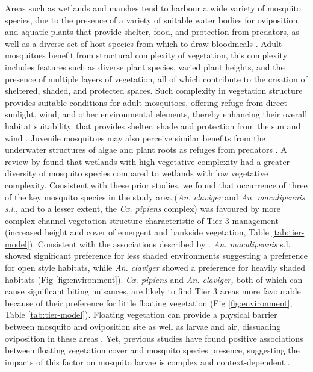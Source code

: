 \documentclass[lineno,sn-basic]{sn-jnl}%
\begin{document}
Areas such as wetlands and marshes tend to harbour a wide variety of mosquito species, due to the presence of a variety of suitable water bodies for oviposition, and aquatic plants that provide shelter, food, and protection from predators, as well as a diverse set of host species from which to draw bloodmeals \citep{medlockPotentialTransmissionWest2005a, beckerMosquitoesTheirControl2010b}. Adult mosquitoes benefit from structural complexity of vegetation, this complexity includes features such as diverse plant species, varied plant heights, and the presence of multiple layers of vegetation, all of which contribute to the creation of sheltered, shaded, and protected spaces. Such complexity in vegetation structure provides suitable conditions for adult mosquitoes, offering refuge from direct sunlight, wind, and other environmental elements, thereby enhancing their overall habitat suitability. that provides shelter, shade and protection from the sun and wind \citep{beckerMosquitoesTheirControl2010b}. Juvenile mosquitoes may also perceive similar benefits from the underwater structures of algae and plant roots as refuges from predators \citep{collinsEffectsRemovalReduction2019a}. A review by \cite{reyNorthAmericanWetlands2012} found that wetlands with high vegetative complexity had a greater diversity of mosquito species compared to wetlands with low vegetative complexity. Consistent with these prior studies, we found that occurrence of three of the key mosquito species in the study area (\textit{An. claviger} and \textit{An. maculipennis s.l.}, and to a lesser extent, the \textit{Cx. pipiens} complex) was favoured by more complex channel vegetation structure characteristic of Tier 3 management (increased height and cover of emergent and bankside vegetation, Table \ref{tab:tier-model}). Consistent with the associations described by \cite{hawkesWetlandMosquitoSurvey2020}. \textit{An. maculipennis} s.l. showed significant preference for less shaded environments suggesting a preference for open style habitats, while \textit{An. claviger} showed a preference for heavily shaded habitats (Fig \ref{fig:environment}). \textit{Cx. pipiens }and\textit{ An. claviger, }both of which can cause significant biting nuisances, are likely to find Tier 3 areas more favourable because of their preference for little floating vegetation (Fig \ref{fig:environment}, Table \ref{tab:tier-model}). Floating vegetation can provide a physical barrier between mosquito and oviposition site as well as larvae and air, dissuading oviposition in these areas \citep{eidEffectDuckweedLemna1992}. Yet, previous studies have found positive associations between floating vegetation cover and mosquito species presence, suggesting the impacts of this factor on mosquito larvae is complex and context-dependent \citep{cuthbertAquaticPlantExtracts2020, goldingIdentifyingBioticInteractions2015a}. 
\end{document}
